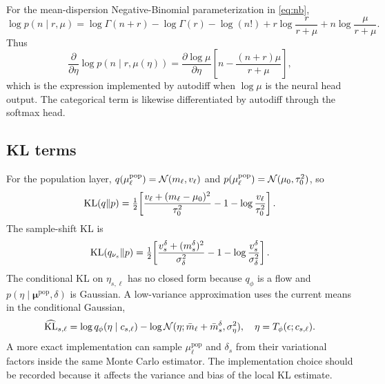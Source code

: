 For the mean-dispersion Negative-Binomial parameterization in \eqref{eq:nb},
\begin{equation}
\log p(n\mid r,\mu)=\log\Gamma(n+r)-\log\Gamma(r)-\log(n!)+r\log\frac{r}{r+\mu}+n\log\frac{\mu}{r+\mu}.
\end{equation}
Thus
\begin{equation}
\frac{\partial}{\partial\eta}\log p(n\mid r,\mu(\eta))
= \frac{\partial\log\mu}{\partial\eta}\left[n-\frac{(n+r)\mu}{r+\mu}\right],
\label{eq:nb-grad}
\end{equation}
which is the expression implemented by autodiff when $\log\mu$ is the neural head output. The categorical term is likewise differentiated by autodiff through the softmax head.

\subsection{KL terms}
For the population layer, $q(\mu^{\mathrm{pop}}_\ell)=\mathcal{N}(m_\ell,v_\ell)$ and $p(\mu^{\mathrm{pop}}_\ell)=\mathcal{N}(\mu_0,\tau_0^2)$, so
\begin{equation}
\mathrm{KL}(q\|p) = \tfrac{1}{2}\!\left[\frac{v_\ell + (m_\ell-\mu_0)^2}{\tau_0^2} - 1 - \log\frac{v_\ell}{\tau_0^2}\right].
\end{equation}
The sample-shift KL is
\begin{equation}
\mathrm{KL}(q_{\nu_s}\|p) = \tfrac{1}{2}\!\left[\frac{v_s^\delta + (m_s^\delta)^2}{\sigma_\delta^2} - 1 - \log\frac{v_s^\delta}{\sigma_\delta^2}\right].
\end{equation}
The conditional KL on $\eta_{s,\ell}$ has no closed form because $q_\phi$ is a flow and $p(\eta\mid\bm{\mu}^{\mathrm{pop}},\delta)$ is Gaussian. A low-variance approximation uses the current means in the conditional Gaussian,
\begin{equation}
\widehat{\mathrm{KL}}_{s,\ell} = \log q_\phi(\eta\mid c_{s,\ell}) - \log\mathcal{N}(\eta;\bar m_\ell+\bar m_s^\delta,\sigma_\eta^2),\quad \eta=T_\phi(\epsilon;c_{s,\ell}).
\label{eq:kl-mc}
\end{equation}
A more exact implementation can sample $\mu^{\mathrm{pop}}_\ell$ and $\delta_s$ from their variational factors inside the same Monte Carlo estimator. The implementation choice should be recorded because it affects the variance and bias of the local KL estimate.

